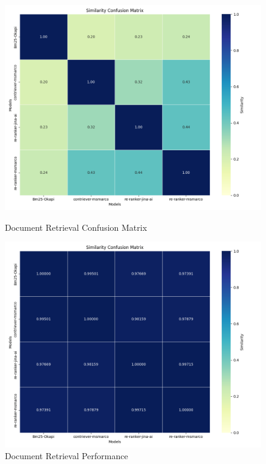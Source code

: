 \begin{figure}[ht!]
    \centering
    \begin{minipage}[b]{0.45\textwidth}
        \centering
        \includegraphics[width=\textwidth]{res/ret_result_sim_1.png}
        \caption{Document Retrieval Confusion Matrix}
        \label{fig:document_retrieval_confusion_matrix_1}
    \end{minipage}
    \hspace{0.05\textwidth} %
    \begin{minipage}[b]{0.45\textwidth}
        \centering
        \includegraphics[width=\textwidth]{res/ret_result_sim_2.png}
        \caption{Document Retrieval Performance}
        \label{fig:document_retrieval_confusion_matrix_2}
    \end{minipage}
\end{figure}

